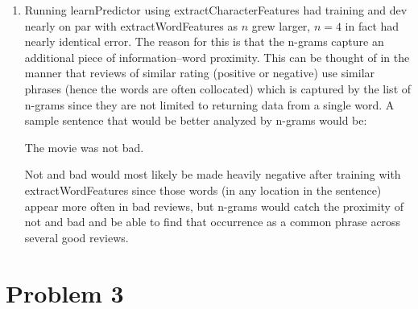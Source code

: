 \documentclass[12pt]{article}
\begin{document}
\begin{enumerate}[label=(\alph*)]
		\item Running learnPredictor using extractCharacterFeatures had training and dev
			nearly on par with extractWordFeatures as \(n\) grew larger, \(n = 4\) in fact
			had nearly identical error. The reason for this is that the n-grams capture
			an additional piece of information--word proximity. This can be thought of
			in the manner that reviews of similar rating (positive or negative) use
			similar phrases (hence the words are often collocated) which is captured by the list of n-grams
			since they are not limited to returning data from a single word.
			A sample sentence that would be better analyzed by n-grams would be:

			The movie was not bad.

			Not and bad would most likely be made heavily negative after training with
			extractWordFeatures since those words (in any location in the sentence)
			appear more often in bad reviews, but n-grams would catch the proximity
			of not and bad and be able to find that occurrence as a common phrase across
			several good reviews.

	\end{enumerate}

	\section*{Problem 3}
\end{document}
